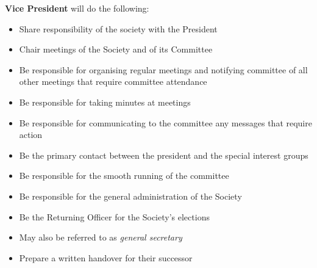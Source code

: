 \begin{subclause}
  \textbf{Vice President} will do the following:
  \begin{itemize}[label=--,topsep=0em,itemsep=0em]
    \item Share responsibility of the society with the President
    \item Chair meetings of the Society and of its Committee
    \item Be responsible for organising regular meetings and notifying committee of all other meetings that require committee attendance
    \item Be responsible for taking minutes at meetings
    \item Be responsible for communicating to the committee any messages that require action
    \item Be the primary contact between the president and the special interest groups
    \item Be responsible for the smooth running of the committee
    \item Be responsible for the general administration of the Society
    \item Be the Returning Officer for the Society's elections
    \item May also be referred to as \textit{general secretary}
    \item Prepare a written handover for their successor
  \end{itemize}
\end{subclause}
